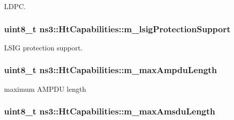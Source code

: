 L\+D\+PC. 

\subsubsection[{\texorpdfstring{m\+\_\+lsig\+Protection\+Support}{m_lsigProtectionSupport}}]{\setlength{\rightskip}{0pt plus 5cm}uint8\+\_\+t ns3\+::\+Ht\+Capabilities\+::m\+\_\+lsig\+Protection\+Support\hspace{0.3cm}{\ttfamily [private]}}\hypertarget{classns3_1_1HtCapabilities_a87f51e202fa1a361ad2ec4b31da894e1}{}\label{classns3_1_1HtCapabilities_a87f51e202fa1a361ad2ec4b31da894e1}


L\+S\+IG protection support. 

\subsubsection[{\texorpdfstring{m\+\_\+max\+Ampdu\+Length}{m_maxAmpduLength}}]{\setlength{\rightskip}{0pt plus 5cm}uint8\+\_\+t ns3\+::\+Ht\+Capabilities\+::m\+\_\+max\+Ampdu\+Length\hspace{0.3cm}{\ttfamily [private]}}\hypertarget{classns3_1_1HtCapabilities_aed935a36c6f0ca2fc2a17ef316f62c81}{}\label{classns3_1_1HtCapabilities_aed935a36c6f0ca2fc2a17ef316f62c81}


maximum A\+M\+P\+DU length 

\subsubsection[{\texorpdfstring{m\+\_\+max\+Amsdu\+Length}{m_maxAmsduLength}}]{\setlength{\rightskip}{0pt plus 5cm}uint8\+\_\+t ns3\+::\+Ht\+Capabilities\+::m\+\_\+max\+Amsdu\+Length\hspace{0.3cm}{\ttfamily [private]}}\hypertarget{classns3_1_1HtCapabilities_a60661663c552a1993f59db61e003b9aa}{}\label{classns3_1_1HtCapabilities_a60661663c552a1993f59db61e003b9aa}


